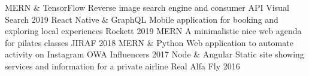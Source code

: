 \begin{cvhonors}
  \cvhonor
    {MERN \& TensorFlow}
    {Reverse image search engine and consumer API}
    {Visual Search}
    {2019}
  \cvhonor
    {React Native \& GraphQL}
    {Mobile application for booking and exploring local experiences}
    {Rockett}
    {2019}
  \cvhonor
    {MERN}
    {A minimalistic nice web agenda for pilates classes}
    {JIRAF}
    {2018}
  \cvhonor
    {MERN \& Python}
    {Web application to automate activity on Instagram}
    {OWA Influencers}
    {2017}
  \cvhonor
    {Node \& Angular}
    {Static site showing services and information for a private airline}
    {Real Alfa Fly}
    {2016}
\end{cvhonors}
